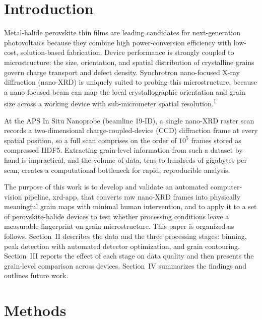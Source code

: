 \documentclass[12pt]{article}
\newcommand{\cq}[1]{\textsuperscript{#1}}
\begin{document}
\clearpage

\section{Introduction}
Metal-halide perovskite thin films are leading candidates for next-generation
photovoltaics because they combine high power-conversion efficiency with
low-cost, solution-based fabrication. Device performance is strongly coupled to
microstructure: the size, orientation, and spatial distribution of crystalline
grains govern charge transport and defect density. Synchrotron nano-focused
X-ray diffraction (nano-XRD) is uniquely suited to probing this microstructure,
because a nano-focused beam can map the local crystallographic orientation and
grain size across a working device with sub-micrometer spatial
resolution.\cq{1}

At the APS In Situ Nanoprobe (beamline 19-ID), a single nano-XRD raster scan
records a two-dimensional charge-coupled-device (CCD) diffraction frame at every
spatial position, so a full scan comprises on the order of $10^5$ frames stored
as compressed HDF5. Extracting grain-level information from such a dataset by
hand is impractical, and the volume of data, tens to hundreds of gigabytes per
scan, creates a computational bottleneck for rapid, reproducible analysis.

The purpose of this work is to develop and validate an automated computer-vision
pipeline, xrd-app, that converts raw nano-XRD frames into physically meaningful
grain maps with minimal human intervention, and to apply it to a set of
perovskite-halide devices to test whether processing conditions leave a
measurable fingerprint on grain microstructure. This paper is organized as
follows. Section~II describes the data and the three processing stages: binning,
peak detection with automated detector optimization, and grain contouring.
Section~III reports the effect of each stage on data quality and then
presents the grain-level comparison across devices. Section~IV summarizes the
findings and outlines future work.

\section{Methods}
\end{document}
